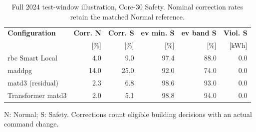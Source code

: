 \begin{table}[!htbp]
\centering
\caption{\illustrativecaption Full 2024 test-window illustration, Core-30 Safety. Nominal correction rates retain the matched Normal reference.}
\label{tab:control-safety-results}
\footnotesize
\setlength{\tabcolsep}{3pt}
\renewcommand{\arraystretch}{1.15}
\begin{tabular*}{\textwidth}{@{\extracolsep{\fill}}lrrrrr@{}}
\toprule
\textbf{Configuration} & \textbf{Corr. N} & \textbf{Corr. S} & \textbf{\gls{ev} min. S} & \textbf{\gls{ev} band S} & \textbf{Viol. S}\\
 & [\%] & [\%] & [\%] & [\%] & [kWh]\\
\midrule
\gls{rbc} Smart Local & 4.0 & 9.0 & 97.4 & 88.0 & 0.0\\
\gls{maddpg} & 14.0 & 25.0 & 92.0 & 74.0 & 0.0\\
\gls{matd3} (residual) & 2.3 & 6.8 & 98.6 & 93.0 & 0.0\\
Transformer \gls{matd3} & 2.0 & 5.1 & 98.8 & 94.0 & 0.0\\
\bottomrule
\end{tabular*}
\par\smallskip\begin{minipage}{\textwidth}\footnotesize N: Normal; S: Safety. Corrections count eligible building decisions with an actual command change.\end{minipage}
\end{table}
